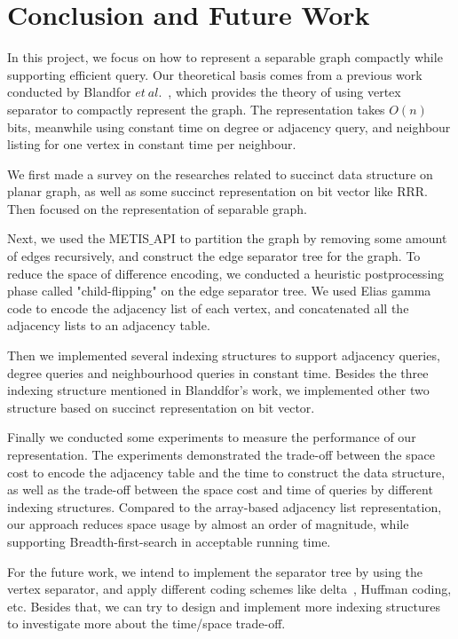 \documentclass[12pt,glossary]{dalthesis}
\begin{document}
\chapter{Conclusion and Future Work}

In this project, we focus on how to represent a separable graph compactly while supporting efficient query. Our theoretical basis comes from a previous work conducted by Blandfor $et \ al.$~\cite{compact-representation}, which provides the theory of using vertex separator to compactly represent the graph. The representation takes $O(n)$ bits, meanwhile using constant time on degree or adjacency query, and neighbour listing for one vertex in constant time per neighbour. 

\bigskip
\bigskip

We first made a survey on the researches related to succinct data structure on planar graph, as well as some succinct representation on bit vector like RRR. Then focused on the representation of separable graph. 

\bigskip
\bigskip

Next, we used the METIS$\_$API to partition the graph by removing some amount of edges recursively, and construct the edge separator tree for the graph. To reduce the space of difference encoding, we conducted a heuristic postprocessing phase called "child-flipping" on the edge separator tree. We used Elias gamma code to encode the adjacency list of each vertex, and concatenated all the adjacency lists to an adjacency table.

\bigskip
\bigskip

Then we implemented several indexing structures to support adjacency queries, degree queries and neighbourhood queries in constant time. Besides the three indexing structure mentioned in Blanddfor's work, we implemented other two structure based on succinct representation on bit vector.

\bigskip
\bigskip

Finally we conducted some experiments to measure the performance of our representation. The experiments demonstrated the trade-off between the space cost to encode the adjacency table and the time to construct the data structure, as well as the trade-off between the space cost and time of queries by different indexing structures. Compared to the array-based adjacency list representation, our approach reduces space usage by almost an order of magnitude, while supporting Breadth-first-search in acceptable running time.

\bigskip
\bigskip

For the future work, we intend to implement the separator tree by using the vertex separator, and apply different coding schemes like delta~\cite{Elias}, Huffman coding, etc. Besides that, we can try to design and implement more indexing structures to investigate more about the time/space trade-off.
 


\end{document}
